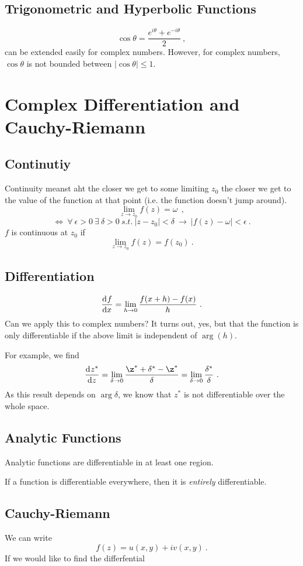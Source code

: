 \documentclass[11pt, a4paper]{report}
\begin{document}
\subsection{Trigonometric and Hyperbolic Functions}
$$
	\cos\theta = \frac{e^{i\theta} + e^{-i\theta}}{2}~,
$$
can be extended easily for complex numbers.
However, for complex numbers, $\cos\theta$ is not bounded between $|\cos\theta| \leq 1$.

\section{Complex Differentiation and Cauchy-Riemann}

\subsection{Continutiy}
Continuity meanst aht the closer we get to some limiting $z_0$ the closer we get to the value of the function at that point (i.e. the function doesn't jump around).
$$
	\lim_{z\rightarrow z_0} f(z) = \omega~~,
$$
$$
	\iff ~ \forall ~ \epsilon > 0 ~ \exists ~ \delta > 0 ~ s.t. ~ | z - z_0 | < \delta ~ \rightarrow ~ |f(z) - \omega|<\epsilon~.
$$
$f$ is continuous at $z_0$ if
$$
	\lim_{z\rightarrow z_0} f(z) = f(z_0)~.
$$

\subsection{Differentiation}
$$
	\frac{\mathrm{d}^{} {f}}{\mathrm{d} {x}^{}} = \lim_{h\rightarrow 0} \frac{f(x+h) - f(x)}{h}~.
$$
Can we apply this to complex numbers?
It turns out, yes, but that the function is only differentiable if the above limit is independent of $\arg(h)$.

For example, we find
$$
	\deriv{z^*}{z} = \lim_{\delta \rightarrow 0} \frac{\z^* + \delta^* - \z^*}{\delta} = \lim_{\delta \rightarrow 0} \frac{\delta^*}{\delta}~.
$$
As this result depends on $\arg\delta$, we know that $z^*$ is not differentiable over the whole space.

\subsection{Analytic Functions}
Analytic functions are differentiable in at least one region.

If a function is differentiable everywhere, then it is \emph{entirely} differentiable.

\subsection{Cauchy-Riemann}
We can write
$$
	f(z) = u(x,y) + iv(x,y)~.
$$
If we would like to find the differfential 
\end{document}
